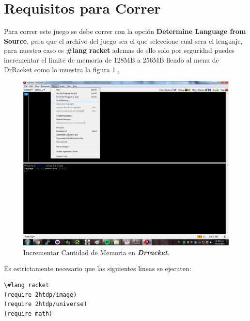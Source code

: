 \documentclass[a4paper]{article} %
\begin{document}
\section{Requisitos para Correr}

Para correr este juego se debe correr con la opción \textbf{Determine Language from Source}, para que el archivo del juego sea el que seleccione cual sera el lenguaje, para nuestro caso es \textbf{\#lang racket}  ademas de ello solo por seguridad puedes incrementar el limite de memoria de 128MB a 256MB llendo al menu de DrRacket como lo muestra la figura \ref{fig:ml} ,

\begin{figure}
  \centering
    \includegraphics[scale=0.35]{images/limmemoria}
  \caption{Incrementar Cantidad de Memoria en \textbf{\textit{Drracket}}.}
  \label{fig:ml}
\end{figure}

Es estrictamente necesario que las siguientes lineas se ejecuten:
\begin{lstlisting}
\#lang racket
(require 2htdp/image)  
(require 2htdp/universe)
(require math)
\end{lstlisting}
\end{document}
